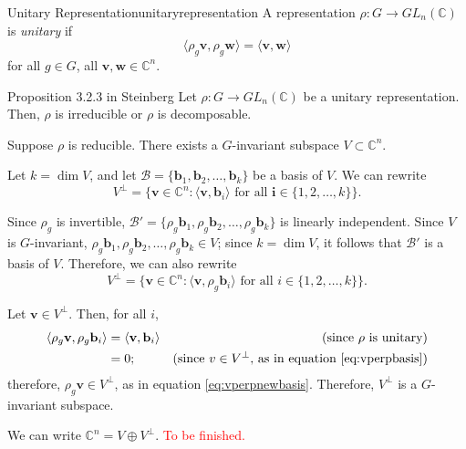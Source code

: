 
\begin{defn}{Unitary Representation}{unitaryrepresentation}
	A representation \(\rho \colon G \to GL_n(\mathbb{C})\) is \emph{unitary} if \[
		\langle \rho_g \mathbf{v}, \rho_g \mathbf{w} \rangle = \langle \mathbf{v}, \mathbf{w} \rangle
	\] for all \(g \in G\), all \(\mathbf{v}, \mathbf{w} \in \mathbb{C}^n\).
\end{defn}

\begin{prop}{Proposition 3.2.3 in Steinberg}{}
	Let \(\rho\colon G \to GL_n(\mathbb{C})\) be a unitary representation.
	Then, \(\rho\) is irreducible or \(\rho\) is decomposable.
\end{prop}

\begin{dem}{}{}
	Suppose \(\rho\) is reducible.
	There exists a \(G\)-invariant subspace \(V \subset \mathbb{C}^n\).

	Let \(k = \dim V\), and let \(\mathcal{B} = \{\mathbf{b}_1, \mathbf{b}_2, \dots, \mathbf{b}_k\}\) be a basis of \(V\).
	We can rewrite
	\begin{equation} \label{eq:vperpbasis}
		V^\perp = \{\mathbf{v} \in \mathbb{C}^n : \langle \mathbf{v}, \mathbf{b}_i \rangle \text{ for all } \mathbf{i} \in \{1, 2, \dots, k\}\}.
	\end{equation}

	Since \(\rho_g\) is invertible, \(\mathcal{B}' = \{\rho_g\mathbf{b}_1, \rho_g\mathbf{b}_2, \dots, \rho_g\mathbf{b}_k\}\) is linearly independent.
	Since \(V\) is \(G\)-invariant, \(\rho_g\mathbf{b}_1,\allowbreak \rho_g\mathbf{b}_2,\allowbreak \dots,\allowbreak \rho_g\mathbf{b}_k \in V\); since \(k = \dim V\), it follows that \(\mathcal{B}'\) is a basis of \(V\).
	Therefore, we can also rewrite
	\begin{equation} \label{eq:vperpnewbasis}
		V^\perp = \{\mathbf{v} \in \mathbb{C}^n : \langle \mathbf{v}, \rho_g\mathbf{b}_i \rangle \text{ for all } i \in \{1, 2, \dots, k\}\}.
	\end{equation}

	Let \(\mathbf{v} \in V^\perp\). Then, for all \(i\),
	\begin{align*}
		\langle \rho_g \mathbf{v}, \rho_g \mathbf{b}_i \rangle &= \langle \mathbf{v}, \mathbf{b}_i \rangle & (\text{since \(\rho\) is unitary})\\
															   &= 0; & (\text{since \(v \in V^\perp\), as in equation \ref{eq:vperpbasis}})
	\end{align*}
	therefore, \(\rho_g \mathbf{v} \in V^\perp\), as in equation \ref{eq:vperpnewbasis}. Therefore, \(V^\perp\) is a \(G\)-invariant subspace.

	We can write \(\mathbb{C}^n = V \oplus V^\perp\). \textcolor{red}{To be finished.}
\end{dem}
